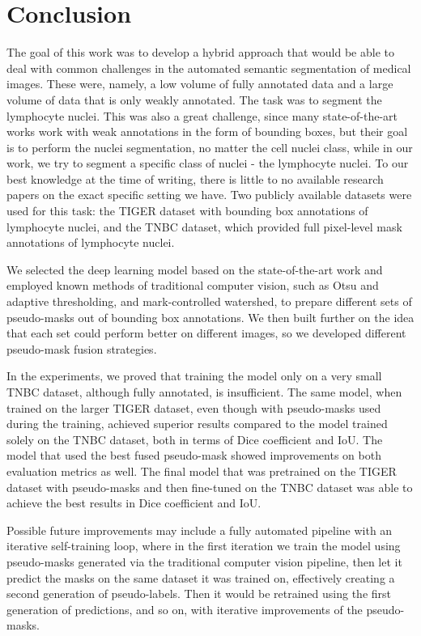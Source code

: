 \chapter{Conclusion}
\label{chapter:conclusion}

The goal of this work was to develop a hybrid approach that would be able to deal with common challenges in the automated semantic segmentation of medical images. These were, namely, a low volume of fully annotated data and a large volume of data that is only weakly annotated. The task was to segment the lymphocyte nuclei. This was also a great challenge, since many state-of-the-art works work with weak annotations in the form of bounding boxes, but their goal is to perform the nuclei segmentation, no matter the cell nuclei class, while in our work, we try to segment a specific class of nuclei - the lymphocyte nuclei. To our best knowledge at the time of writing, there is little to no available research papers on the exact specific setting we have. Two publicly available datasets were used for this task: the TIGER dataset \cite{tiger_dataset} with bounding box annotations of lymphocyte nuclei, and the TNBC \cite{TNBC-nuclei-seg-extended} dataset, which provided full pixel-level mask annotations of lymphocyte nuclei. 

We selected the deep learning model based on the state-of-the-art work and employed known methods of traditional computer vision, such as Otsu and adaptive thresholding, and mark-controlled watershed, to prepare different sets of pseudo-masks out of bounding box annotations. We then built further on the idea that each set could perform better on different images, so we developed different pseudo-mask fusion strategies.

In the experiments, we proved that training the model only on a very small TNBC dataset, although fully annotated, is insufficient. The same model, when trained on the larger TIGER dataset, even though with pseudo-masks used during the training, achieved superior results compared to the model trained solely on the TNBC dataset, both in terms of Dice coefficient and IoU. The model that used the best fused pseudo-mask showed improvements on both evaluation metrics as well. The final model that was pretrained on the TIGER dataset with pseudo-masks and then fine-tuned on the TNBC dataset was able to achieve the best results in Dice coefficient and IoU.

Possible future improvements may include a fully automated pipeline with an iterative self-training loop, where in the first iteration we train the model using pseudo-masks generated via the traditional computer vision pipeline, then let it predict the masks on the same dataset it was trained on, effectively creating a second generation of pseudo-labels. Then it would be retrained using the first generation of predictions, and so on, with iterative improvements of the pseudo-masks.



